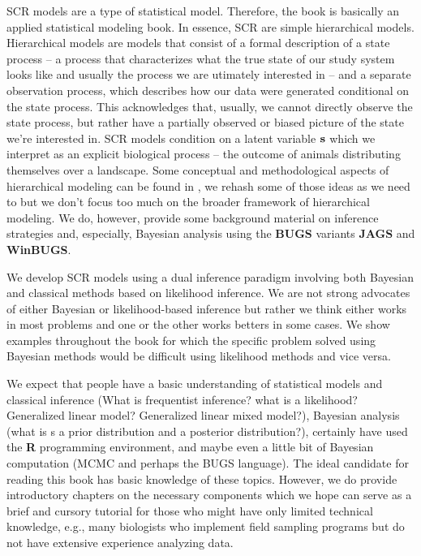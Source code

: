 SCR models are a type of statistical model. Therefore, the book is
basically an applied statistical modeling book.  In essence, SCR are
simple hierarchical models.  Hierarchical models are models that
consist of a formal description of a state process -- a process that
characterizes what the true state of our study system looks like and
usually the process we are utimately interested in -- and a separate
observation process, which describes how our data were generated
conditional on the state process. This acknowledges that, usually, we
cannot directly observe the state process, but rather have a partially
observed or biased picture of the state we're interested in.  SCR
models condition on a latent variable ${\bf s}$ which we interpret as
an explicit biological process -- the outcome of animals distributing
themselves over a landscape.  Some conceptual and methodological
aspects of hierarchical modeling can be found in
\citet{royle_dorazio:2008}, we rehash some of those ideas as we need
to but we don't focus too much on the broader framework of
hierarchical modeling.  We do, however, provide some background
material on inference strategies and, especially, Bayesian analysis
using the {\bf BUGS} variants {\bf JAGS} and {\bf WinBUGS}.

We develop SCR models using a dual inference paradigm involving both
Bayesian and classical methods based on likelihood inference.
We are not strong advocates of either Bayesian or likelihood-based
inference but rather we think either works in most problems and one or
the other works betters in some cases. 
We show examples throughout the
book for which the specific problem solved using Bayesian methods
would be difficult using likelihood methods and vice versa.

We expect that people have a basic understanding of statistical models 
and classical inference (What is frequentist inference? what is a 
likelihood? Generalized linear model? Generalized linear mixed 
model?), Bayesian analysis (what is s a prior distribution and a 
posterior distribution?), certainly have used the {\bf R} programming 
environment, and maybe even a little bit of Bayesian computation (MCMC 
and perhaps the BUGS language).  The ideal candidate for reading this 
book has basic knowledge of these topics. However, we do provide 
introductory chapters on the necessary components which we hope can 
serve as a brief and cursory tutorial for those who might have only 
limited technical knowledge, e.g., many biologists who implement field 
sampling programs but do not have extensive experience analyzing data. 




